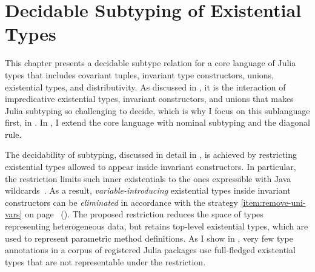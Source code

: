 \chapter{Decidable Subtyping of Existential Types}%
\label{chap:dec-sub}

This chapter presents a decidable subtype relation for a core language
of Julia types that includes covariant tuples, invariant type constructors,
unions, existential types, and distributivity.
As discussed in , it is the interaction of
impredicative existential types, invariant constructors, and unions that makes
Julia subtyping so challenging to decide, which is why I focus
on this sublanguage first, in .
In , I extend the core language with nominal subtyping
and the diagonal rule.

The decidability of subtyping, %
discussed in detail in , is achieved by
restricting existential types allowed to appear inside invariant 
constructors. In particular, the restriction limits such inner existentials 
to the ones expressible with Java wildcards~\cite{bib:torgersen:wildcards:2004}.
As a result, \emph{variable-introducing} existential types inside invariant
constructors can be \emph{eliminated} in accordance with 
the strategy \ref{item:remove-uni-vars}
on page~\pageref{item:remove-uni-vars} ().
The proposed restriction reduces the space of types representing heterogeneous
data, but retains top-level existential types, which are used to represent
parametric method definitions.
As I show in , very few type annotations in a corpus of
registered Julia packages use full-fledged existential types that are not
representable under the restriction.


